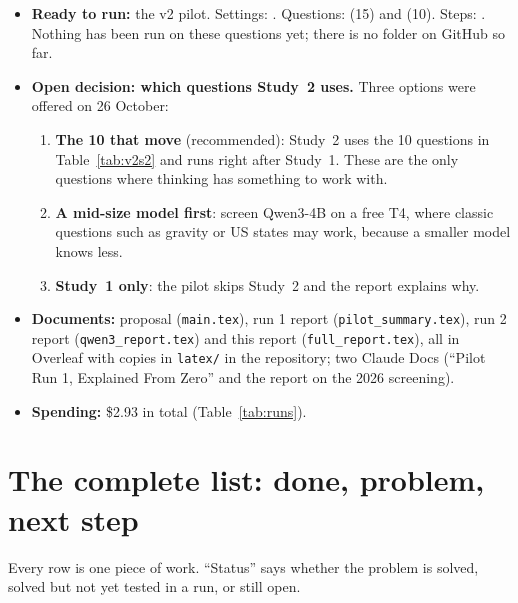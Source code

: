 \documentclass[11pt,a4paper]{article}
\begin{document}
\begin{itemize}
  \item \textbf{Ready to run:} the v2 pilot. Settings: . Questions:  (15) and  (10). Steps: . Nothing has been run on these questions yet; there is no  folder on GitHub so far.
  \item \textbf{Open decision: which questions Study~2 uses.} Three options were offered on 26 October:
  \begin{enumerate}
    \item \textbf{The 10 that move} (recommended): Study~2 uses the 10 questions in Table~\ref{tab:v2s2} and runs right after Study~1. These are the only questions where thinking has something to work with.
    \item \textbf{A mid-size model first}: screen Qwen3-4B on a free T4, where classic questions such as gravity or US states may work, because a smaller model knows less.
    \item \textbf{Study~1 only}: the pilot skips Study~2 and the report explains why.
  \end{enumerate}
  \item \textbf{Documents:} proposal (\texttt{main.tex}), run 1 report (\texttt{pilot\_summary.tex}), run 2 report (\texttt{qwen3\_report.tex}) and this report (\texttt{full\_report.tex}), all in Overleaf with copies in \texttt{latex/} in the repository; two Claude Docs (``Pilot Run 1, Explained From Zero'' and the report on the 2026 screening).
  \item \textbf{Spending:} \$2.93 in total (Table~\ref{tab:runs}).
\end{itemize}

\section{The complete list: done, problem, next step}
\label{sec:biglist}

Every row is one piece of work. ``Status'' says whether the problem is solved, solved but not yet tested in a run, or still open.
\end{document}

